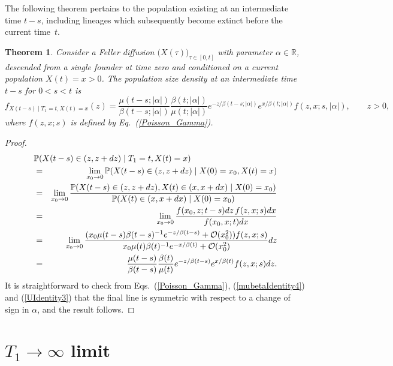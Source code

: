 \documentclass[preprint,12pt]{elsarticle}
\newtheorem{theorem}{Theorem}
\begin{document}
The following theorem pertains to the population existing at an intermediate time $t - s$, including lineages which subsequently become extinct 
before the current time~$t$.  
\begin{theorem}	\label{theorem:pastPopn}
Consider a Feller diffusion $\big(X(\tau)\big)_{\tau \in [0, t]}$ with parameter $\alpha \in \mathbb{R}$, 
descended from a single founder at time zero and conditioned on a current population $X(t) = x > 0$. 
The population size density at an intermediate time $t - s$ for $0< s < t$ is 
\[
f_{X(t - s) \mid T_1=t, X(t) = x} (z) 
	=  \frac{\mu(t - s; |\alpha|)}{\beta(t - s; |\alpha|)}\frac{\beta(t; |\alpha|)}{\mu(t; |\alpha|)} e^{-z/\beta(t - s; |\alpha|)} e^{x/\beta(t; |\alpha|)} f(z, x; s, |\alpha|), \qquad z >0,  
\]
where $f(z, x; s)$ is defined by Eq.~(\ref{Poisson_Gamma}). 
\end{theorem}
%
\begin{proof}
\begin{eqnarray*}
\lefteqn{\mathbb{P}(X(t - s) \in (z, z + dz) \mid T_1=t, X(t) = x)} \nonumber \\
	& = & \lim_{x_0 \to 0} \mathbb{P}(X(t - s) \in (z, z + dz) \mid X(0) = x_0, X(t) = x) \nonumber \\
	& = & \lim_{x_0 \to 0} \frac{\mathbb{P}(X(t - s) \in (z, z + dz), X(t) \in (x, x + dx) \mid X(0) = x_0)}
									{\mathbb{P}(X(t) \in (x, x + dx)\mid X(0) = x_0)} \nonumber \\
	& = & \lim_{x_0 \to 0} \frac{f(x_0, z; t - s)dz\, f(z, x; s)dx}{f(x_0, x; t)dx} \nonumber \\  
	& = & \lim_{x_0 \to 0} \frac{(x_0 \mu(t - s) \beta(t - s)^{-1} e^{-z/\beta(t - s)} + \mathcal{O}(x_0^2)) f(z, x; s)}
							{x_0 \mu(t) \beta(t)^{-1} e^{-x/\beta(t)} + \mathcal{O}(x_0^2)} dz  \nonumber \\
	& = & \frac{\mu(t - s)}{\beta(t - s)}\frac{\beta(t)}{\mu(t)} e^{-z/\beta(t - s)} e^{x/\beta(t)} f(z, x; s) dz. 
\end{eqnarray*}
It is straightforward to check from Eqs.~(\ref{Poisson_Gamma}), (\ref{mubetaIdentity4}) and (\ref{UIdentity3}) that the final line is symmetric with respect 
to a change of sign in $\alpha$, and the result follows.  
\end{proof}

%
%
\section{$T_1 \to \infty$ limit}	\label{sec:TInfLimit}
\end{document}
